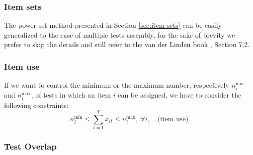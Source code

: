 \subsubsection{Item sets}

The power-set method presented in Section \ref{sec:item-sets} can be easily generalized to the case of multiple tests assembly, for the sake of brevity we prefer to skip the details and still refer to the van der Linden book \textcite{VDL2005}, Section 7.2.

\subsubsection{Item use}\label{sec:item-use}

If we want to control the minimum or the maximum number, respectively $n^{\min}_i$ and $n^{\max}_i$, of tests in which an item $i$ can be assigned, we have to consider the following constraints:
\begin{subequations}[resume]
	\begin{equation}\label{eq:Mmod:Muse}
	n^{\min}_i \le \sum_{t=1}^T x_{it} \le n^{\max}_i, \ \forall i, \quad \mbox{(item use)}
	\end{equation}
\end{subequations}

\subsubsection{Test Overlap}\label{sec:test-overlap}

